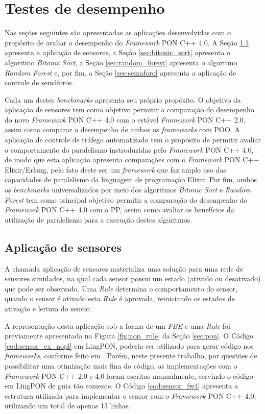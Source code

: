 \section{Testes de desempenho}\label{sec:perf_test}

Nas seções seguintes são apresentadas as aplicações desenvolvidas com o
propósito de avaliar o desempenho do \textit{Framework} PON C++ 4.0. A Seção
\ref{sec:sensores} apresenta a aplicação de sensores, a Seção
\ref{sec:bitonic_sort} apresenta o algoritmo \textit{Bitonic Sort}, a Seção
\ref{sec:random_forest} apresenta o algoritmo \textit{Random Forest} e, por fim,
a Seção \ref{sec:semaforo} apresenta a aplicação de controle de semáforos.

Cada um destes \textit{benchmarks} apresenta seu próprio propósito. O objetivo
da aplicação de sensores tem como objetivo permitir a comparação do desempenho
do novo \textit{Framework} PON C++ 4.0 com o estável \textit{Framework} PON C++
2.0, assim como comparar o desempenho de ambos os \textit{frameworks} com POO. A
aplicação de controle de tráfego automatizado tem o propósito de permitir
avaliar o comportamento do paralelismo instroduzidas pelo \textit{Framework} PON
C++ 4.0, de modo que esta aplicação apresenta comparações com o
\textit{Framework} PON C++ Elixir/Erlang, pelo fato deste ser um
\textit{framework} que faz amplo uso das capacidades de paralelismo da linguagem
de programação Elixir. Por fim, ambos os \textit{benchmarks} universalizados por
meio dos algoritmos \textit{Bitonic Sort} e \textit{Random Forest} tem como
principal objetivo permitir a comparação do desempenho do \textit{Framework} PON
C++ 4.0 com o PP, assim como avaliar os benefícios da utilização de paralelismo
para a execução destes algoritmos.

\subsection{Aplicação de sensores}\label{sec:sensores}

A chamada aplicação de sensores materializa uma solução para uma rede de
sensores simulados, na qual cada sensor possui um estado (ativado ou desativado)
que pode ser observado. Uma \textit{Rule} determina o comportamento do sensor, quando o
sensor é ativado esta \textit{Rule} é aprovada, reiniciando os estados de ativação e
leitura do sensor.%

A representação desta aplicação sob a forma de um \textit{FBE} e uma
\textit{Rule} foi previamente apresentada na Figura \ref{fig:nop_rule} da Seção
\ref{sec:pon}. O Código \ref{cod:sensor_ex_nopl} em LingPON, poderia ser utilizado para gerar código nos
\textit{frameworks}, conforme feito em \cite{skora_2020}. Porém, neste presente
trabalho, por questões de possibilitar uma otimização mais fina do código, as
implementações com o \textit{Framework} PON C++ 2.0 e 4.0 foram escritas
manualmente, servindo o código em LingPON de guia tão somente. O Código
\ref{cod:sensor_fw4} apresenta a estrutura utilizada para implementar o sensor
com o \textit{Framework} PON C++ 4.0, utilizando um total de apenas 13 linhas.


